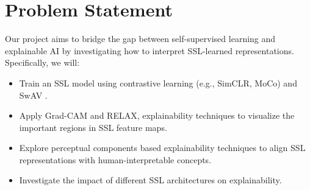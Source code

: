 \section{Problem Statement}
\label{sec:problem_statement}

Our project aims to bridge the gap between self-supervised learning and explainable AI by investigating how to interpret SSL-learned representations. Specifically, we will:
\begin{itemize}
    \item Train an SSL model using contrastive learning (e.g., SimCLR\cite{chen2020simple}, MoCo\cite{he2020momentum}) and SwAV \cite{caron2020unsupervised}.
    \item Apply Grad-CAM\cite{selvaraju2017grad} and RELAX\cite{wickstrom2023relax},  explainability techniques to visualize the important regions in SSL feature maps.
    \item Explore perceptual components based \cite{yarici2024explaining} explainability techniques to align SSL representations with human-interpretable concepts.
    \item Investigate the impact of different SSL architectures on explainability.
\end{itemize}
